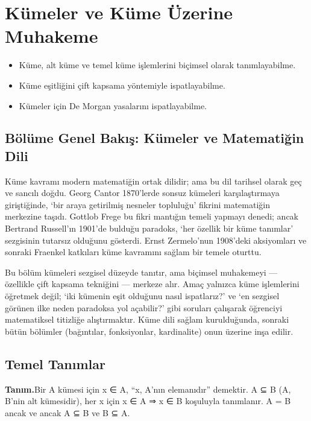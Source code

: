 \chapter{Kümeler ve Küme Üzerine Muhakeme}
\label{chap:kumeler}


\par{}\nopagebreak

\begin{itemize}\setlength{\itemsep}{2pt}\setlength{\parskip}{0pt}
\item Küme, alt küme ve temel küme işlemlerini biçimsel olarak tanımlayabilme.
\item Küme eşitliğini çift kapsama yöntemiyle ispatlayabilme.
\item Kümeler için De Morgan yasalarını ispatlayabilme.
\end{itemize}

\section*{Bölüme Genel Bakış: Kümeler ve Matematiğin Dili}

Küme kavramı modern matematiğin ortak dilidir; ama bu dil tarihsel olarak geç ve sancılı doğdu. Georg Cantor 1870’lerde sonsuz kümeleri karşılaştırmaya giriştiğinde, ‘bir araya getirilmiş nesneler topluluğu’ fikrini matematiğin merkezine taşıdı. Gottlob Frege bu fikri mantığın temeli yapmayı denedi; ancak Bertrand Russell’ın 1901’de bulduğu paradoks, ‘her özellik bir küme tanımlar’ sezgisinin tutarsız olduğunu gösterdi. Ernst Zermelo’nun 1908’deki aksiyomları ve sonraki Fraenkel katkıları küme kavramını sağlam bir temele oturttu.

Bu bölüm kümeleri sezgisel düzeyde tanıtır, ama biçimsel muhakemeyi — özellikle çift kapsama tekniğini — merkeze alır. Amaç yalnızca küme işlemlerini öğretmek değil; ‘iki kümenin eşit olduğunu nasıl ispatlarız?’ ve ‘en sezgisel görünen ilke neden paradoksa yol açabilir?’ gibi soruları çalışarak öğrenciyi matematiksel titizliğe alıştırmaktır. Küme dili sağlam kurulduğunda, sonraki bütün bölümler (bağıntılar, fonksiyonlar, kardinalite) onun üzerine inşa edilir.

\section{Temel Tanımlar}

\begin{tcolorbox}[bookbox,colback=cDef]\textbf{\textsf{\textcolor{cAcc}{Tanım.}}}\quad Bir A kümesi için x ∈ A, “x, A’nın elemanıdır” demektir. A ⊆ B (A, B’nin alt kümesidir), her x için x ∈ A ⇒ x ∈ B koşuluyla tanımlanır. A = B ancak ve ancak A ⊆ B ve B ⊆ A.\end{tcolorbox}


